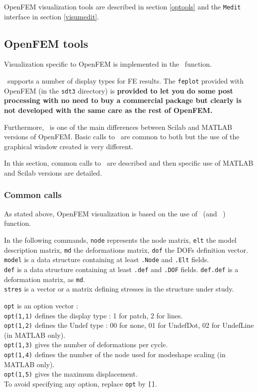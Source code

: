 OpenFEM visualization tools are described in section \ref{optools} and the {\tt Medit} interface in section \ref{visumedit}.  


\subsection{OpenFEM tools \label{optools}}

Visualization specific to OpenFEM is implemented in the \feplot\ function.

\feplot\  supports a number of display types for FE results. The {\tt feplot} provided with OpenFEM (in the {\tt sdt3} directory) is \textbf{provided to let you do some post processing with no need to buy a commercial package but clearly is not developed with the same care as the rest of OpenFEM.}

Furthermore, \feplot\ is one of the main differences between Scilab and MATLAB versions of OpenFEM. Basic calls to \feplot\ are common to both but the use of the graphical window created is very different.

In this section, common calls to \feplot\ are described and then specific use of MATLAB and Scilab versions are detailed.

\subsubsection{Common calls \label{comcalls}}
As stated above, OpenFEM visualization is based on the use of \feplot\ (and \fecom\ ) function.

In the following commands, \verb+node+ represents the node matrix, \verb+elt+ the model description matrix, \verb+md+ the deformations matrix, \verb+dof+ the DOFs definition vector.\\
\verb+model+ is a data structure containing at least \verb+.Node+ and \verb+.Elt+ fields.\\
\verb+def+ is a data structure containing at least \verb+.def+ and \verb+.DOF+ fields. {\tt def.def} is a deformation matrix, as {\tt md}.\\
\verb+stres+ is a vector or a matrix defining stresses in the structure under study.

\verb+opt+ is an option vector : \\
\verb+opt(1,1)+ defines the display type : 1 for patch, 2 for lines.\\
\verb+opt(1,2)+ defines the Undef type : 00 for none, 01 for UndefDot, 02 for UndefLine (in MATLAB only).\\
\verb+opt(1,3)+ gives the number of deformations per cycle.\\
\verb+opt(1,4)+ defines the number of the node used for modeshape scaling (in MATLAB only).\\
\verb+opt(1,5)+ gives the maximum displacement. \\
To avoid specifying any option, replace \verb+opt+ by \verb+[]+.\\

